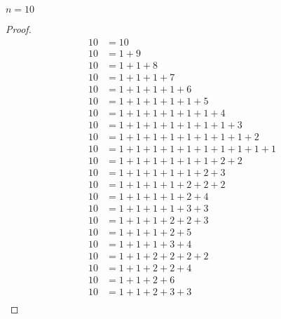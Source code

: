 \begin{exercise}
    $n = 10$
\end{exercise}

\begin{proof}
    \begin{align*}
        10 & = 10                                              \\
        10 & = 1 + 9                                           \\
        10 & = 1 + 1 + 8                                       \\
        10 & = 1 + 1 + 1 + 7                                   \\
        10 & = 1 + 1 + 1 + 1 + 6                               \\
        10 & = 1 + 1 + 1 + 1 + 1 + 5                           \\
        10 & = 1 + 1 + 1 + 1 + 1 + 1 + 4                       \\
        10 & = 1 + 1 + 1 + 1 + 1 + 1 + 1 + 3                   \\
        10 & = 1 + 1 + 1 + 1 + 1 + 1 + 1 + 1 + 2               \\
        10 & = 1 + 1 + 1 + 1 + 1 + 1 + 1 + 1 + 1 + 1           \\
        10 & = 1 + 1 + 1 + 1 + 1 + 1 + 2 + 2                   \\
        10 & = 1 + 1 + 1 + 1 + 1 + 2 + 3                       \\
        10 & = 1 + 1 + 1 + 1 + 2 + 2 + 2                       \\
        10 & = 1 + 1 + 1 + 1 + 2 + 4                           \\
        10 & = 1 + 1 + 1 + 1 + 3 + 3                           \\
        10 & = 1 + 1 + 1 + 2 + 2 + 3                           \\
        10 & = 1 + 1 + 1 + 2 + 5                               \\
        10 & = 1 + 1 + 1 + 3 + 4                               \\
        10 & = 1 + 1 + 2 + 2 + 2 + 2                           \\
        10 & = 1 + 1 + 2 + 2 + 4                               \\
        10 & = 1 + 1 + 2 + 6                                   \\
        10 & = 1 + 1 + 2 + 3 + 3                               \\

\end{align*}
\end{proof}

